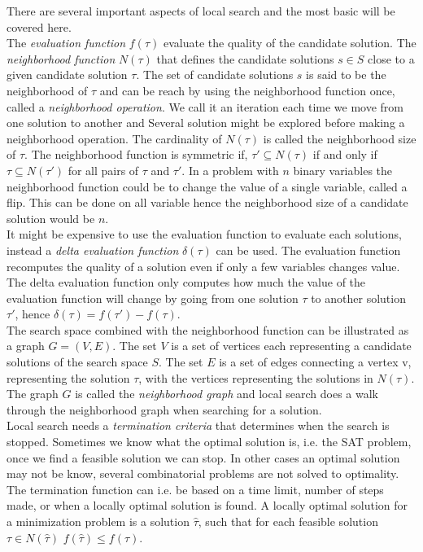 There are several important aspects of local search and the most basic will be covered here. \\The \emph{evaluation 
function}
$f(\tau)$ evaluate the quality of the candidate solution. 
The \emph{neighborhood function} $N(\tau)$ that defines the candidate solutions $s \in S$ close to a given candidate 
solution $\tau$. The set of candidate solutions $s$ is said to be the neighborhood of $\tau$ and can be reach by using 
the neighborhood function once, called a \emph{neighborhood operation}. We call it an iteration each time we move from 
one solution to another and Several solution might be explored before making a neighborhood operation. The cardinality 
of $N(\tau)$ is called the neighborhood size of $\tau$. The neighborhood function is symmetric if, $\tau' \subseteq 
N(\tau)$ if and only if $\tau \subseteq N(\tau')$ for all pairs of $\tau$ and $\tau'$. 
In a problem with $n$ binary variables the neighborhood function could be to change the value of a single variable, 
called a flip. This can be done on all variable hence the neighborhood size of a candidate solution would be $n$. \\ 
It might be expensive to use the evaluation function to evaluate each solutions, instead a \emph{delta evaluation 
function} $\delta(\tau)$ can be used. The evaluation function recomputes the quality of a solution even if only a few 
variables changes value. The delta evaluation function only computes how much the value of the evaluation function will 
change by going from one solution $\tau$ to another solution $\tau'$, hence $\delta(\tau) = f(\tau')-f(\tau)$. \\
The search space combined with the neighborhood function can be illustrated as a graph $G = (V,E)$. The 
set $V$ is a set of vertices each representing a candidate solutions of the search space $S$. The set $E$ is a set of 
edges connecting a vertex v, representing the solution $\tau$, with the vertices representing the solutions 
in $N(\tau)$. The graph $G$ is called the \emph{neighborhood graph} and local search does a walk through the 
neighborhood graph when searching for a solution. \cite[p. 3-5]{lsbog} \\ 
Local search needs a \emph{termination criteria} that determines when the search is stopped. Sometimes we know what 
the optimal solution is, i.e. the SAT problem, once we find a feasible solution we can stop. In other cases an optimal 
solution may not be know, several combinatorial problems are not solved to optimality. The termination function can i.e. 
be based on a time limit, number of steps made, or when a locally optimal solution is found. A locally optimal solution 
for a minimization problem is a solution $\hat{\tau}$, such that for each feasible solution $\tau \in N(\hat{\tau})$ 
$f(\hat{\tau}) \leq f(\tau)$. \\
